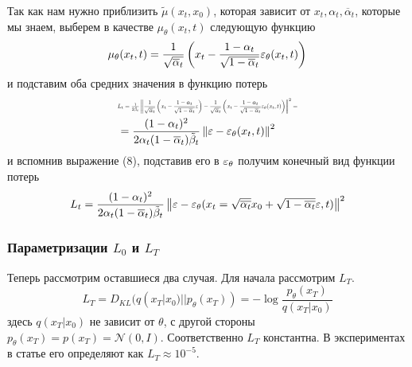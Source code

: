 \documentclass[11pt, a4paper, twocolumn, twoside]{article} %
\begin{document}
Так как нам нужно приблизить $\tilde\mu(x_t, x_0)$, которая зависит от $x_t, \alpha_t, \overline\alpha_t$, которые мы знаем, выберем в качестве $\mu_\theta(x_t, t)$ следующую функцию
\begin{equation}
	\mu_\theta(x_t, t) = \dfrac{1}{\sqrt{\overline\alpha_t}}\left(x_t - \dfrac{1-\alpha_t}{\sqrt{1-\overline\alpha_t}}\varepsilon_{\theta}(x_t,t)\right)
\end{equation}
и подставим оба средних значения в функцию потерь
\begin{align*}
	& \resizebox{0.47\textwidth}{!}{$L_t = \frac{1}{2\tilde\beta_t}\norm{\dfrac{1}{\sqrt{\overline\alpha_t}}\left(x_t - \dfrac{1-\alpha_t}{\sqrt{1-\overline\alpha_t}}\eps\right) - \dfrac{1}{\sqrt{\overline\alpha_t}}\left(x_t - \dfrac{1-\alpha_t}{\sqrt{1-\overline\alpha_t}}\eps_{\theta}(x_t,t)\right)}^2 =$} \\
	& = \frac{(1-\alpha_t)^2}{2\alpha_t(1-\overline\alpha_t)\tilde\beta_t}\norm{\eps - \eps_{\theta}(x_t,t)}^2
\end{align*}
и вспомнив выражение (8), подставив его в $\varepsilon_\theta$ получим конечный вид функции потерь
\begin{equation}
	L_t = \frac{(1-\alpha_t)^2}{2\alpha_t(1-\overline\alpha_t)\tilde\beta_t}\left\Vert \varepsilon - \varepsilon_{\theta}(x_t = \sqrt{\overline{\alpha_t}}x_0 + \sqrt{1-\overline{\alpha_t}} \varepsilon,t) \right\Vert^2
\end{equation}


\subsubsection{Параметризации $L_0$ и $L_T$}

Теперь рассмотрим оставшиеся два случая. Для начала рассмотрим $L_T$. 
\begin{equation*}
	L_T = D_{KL}(q(x_T|x_0)||p_\theta(x_T)) = -\log\dfrac{p_\theta(x_T)}{q(x_T|x_0)}
\end{equation*}
здесь $q(x_T|x_0)$ не зависит от $\theta$, с другой стороны $p_\theta(x_T) = p(x_T) = \mathcal{N}(0, I)$. Соответственно $L_T$ константна. В экспериментах в статье \cite{Ho2020} его определяют как $L_T\approx10^{-5}$.
\end{document}
